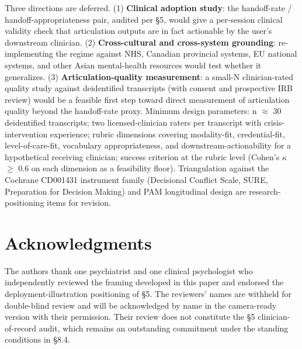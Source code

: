 \documentclass[letterpaper]{article}
\begin{document}
Three directions are deferred. (1) \textbf{Clinical adoption study}: the handoff-rate / handoff-appropriateness pair, audited per \S5, would give a per-session clinical validity check that articulation outputs are in fact actionable by the user's downstream clinician. (2) \textbf{Cross-cultural and cross-system grounding}: re-implementing the regime against NHS, Canadian provincial systems, EU national systems, and other Asian mental-health resources would test whether it generalizes. (3) \textbf{Articulation-quality measurement}: a small-N clinician-rated quality study against deidentified transcripts (with consent and prospective IRB review) would be a feasible first step toward direct measurement of articulation quality beyond the handoff-rate proxy. Minimum design parameters: n $\approx$ 30 deidentified transcripts; two licensed-clinician raters per transcript with crisis-intervention experience; rubric dimensions covering modality-fit, credential-fit, level-of-care-fit, vocabulary appropriateness, and downstream-actionability for a hypothetical receiving clinician; success criterion at the rubric level (Cohen's $\kappa$ $\geq$ 0.6 on each dimension as a feasibility floor). Triangulation against the Cochrane CD001431 instrument family (Decisional Conflict Scale, SURE, Preparation for Decision Making) and PAM longitudinal design are research-positioning items for revision.

\section*{Acknowledgments}

The authors thank one psychiatrist and one clinical psychologist who independently reviewed the framing developed in this paper and endorsed the deployment-illustration positioning of \S5. The reviewers' names are withheld for double-blind review and will be acknowledged by name in the camera-ready version with their permission. Their review does not constitute the \S5 clinician-of-record audit, which remains an outstanding commitment under the standing conditions in \S8.4.


\end{document}
